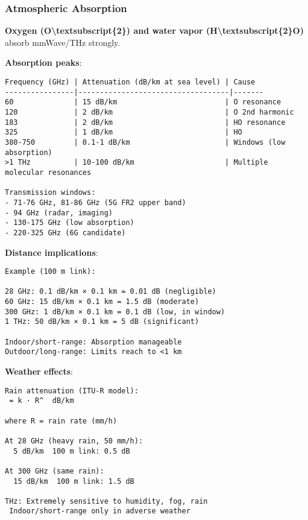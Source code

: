 \subsubsection{Atmospheric Absorption}\label{atmospheric-absorption}

\textbf{Oxygen (O\textbackslash textsubscript\{2\}) and water vapor
(H\textbackslash textsubscript\{2\}O)} absorb mmWave/THz strongly.

\textbf{Absorption peaks}:

\begin{verbatim}
Frequency (GHz) | Attenuation (dB/km at sea level) | Cause
----------------|-----------------------------------|-------
60              | 15 dB/km                         | O resonance
120             | 2 dB/km                          | O 2nd harmonic
183             | 2 dB/km                          | HO resonance
325             | 1 dB/km                          | HO
380-750         | 0.1-1 dB/km                      | Windows (low absorption)
>1 THz          | 10-100 dB/km                     | Multiple molecular resonances

Transmission windows:
- 71-76 GHz, 81-86 GHz (5G FR2 upper band)
- 94 GHz (radar, imaging)
- 130-175 GHz (low absorption)
- 220-325 GHz (6G candidate)
\end{verbatim}

\textbf{Distance implications}:

\begin{verbatim}
Example (100 m link):

28 GHz: 0.1 dB/km × 0.1 km = 0.01 dB (negligible)
60 GHz: 15 dB/km × 0.1 km = 1.5 dB (moderate)
300 GHz: 1 dB/km × 0.1 km = 0.1 dB (low, in window)
1 THz: 50 dB/km × 0.1 km = 5 dB (significant)

Indoor/short-range: Absorption manageable
Outdoor/long-range: Limits reach to <1 km
\end{verbatim}

\textbf{Weather effects}:

\begin{verbatim}
Rain attenuation (ITU-R model):
 = k · R^  dB/km

where R = rain rate (mm/h)

At 28 GHz (heavy rain, 50 mm/h):
  5 dB/km  100 m link: 0.5 dB

At 300 GHz (same rain):
  15 dB/km  100 m link: 1.5 dB

THz: Extremely sensitive to humidity, fog, rain
 Indoor/short-range only in adverse weather
\end{verbatim}

